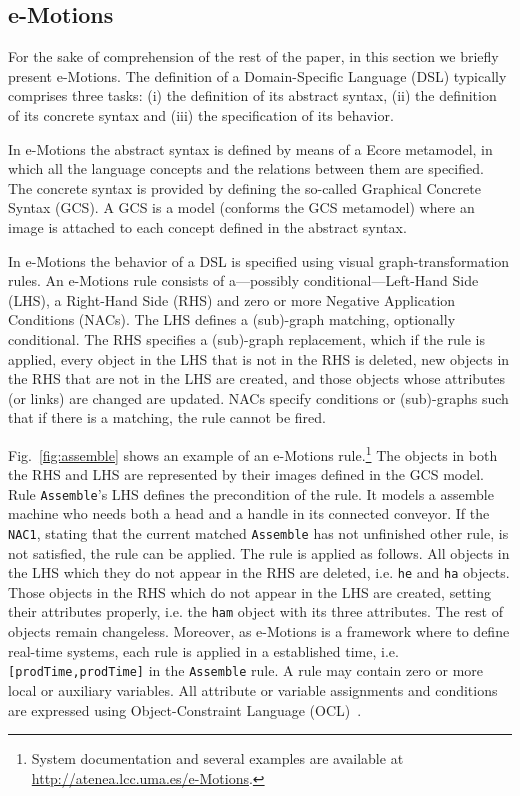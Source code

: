 \documentclass[draft]{llncs}
\newcommand{\code}[1]{{\texttt{#1}}}
\begin{document}
\subsection{e-Motions}\label{sub:emotions}
For the sake of comprehension of the rest of the paper, in this section we briefly present e-Motions. The definition of a Domain-Specific Language (DSL) typically comprises three tasks: (i) the definition of its abstract syntax, (ii) the definition of its concrete syntax and (iii) the specification of its behavior.

In e-Motions the abstract syntax is defined by means of a Ecore metamodel, in which all the language concepts and the relations between them are specified. The concrete syntax is provided by defining the so-called Graphical Concrete Syntax (GCS). A GCS is a model (conforms the GCS metamodel) where an image is attached to each concept defined in the abstract syntax.

In e-Motions the behavior of a DSL is specified using visual graph-transformation rules. An e-Motions rule consists of a---possibly conditional---Left-Hand Side (LHS), a Right-Hand Side (RHS) and zero or more Negative Application Conditions (NACs). The LHS defines a (sub)-graph matching, optionally conditional. The RHS specifies a (sub)-graph replacement, which if the rule is applied, every object in the LHS that is not in the RHS is deleted, new objects in the RHS that are not in the LHS are created, and those objects whose attributes (or links) are changed are updated. NACs specify conditions or (sub)-graphs such that if there is a matching, the rule cannot be fired.

Fig.~\ref{fig:assemble} shows an example of an e-Motions rule.\footnote{System documentation and several examples are available at \url{http://atenea.lcc.uma.es/e-Motions}.} The objects in both the RHS and LHS are represented by their images defined in the GCS model. Rule \code{Assemble}'s LHS defines the precondition of the rule. It models a assemble machine who needs both a head and a handle in its connected conveyor. If the \code{NAC1}, stating that the current matched \code{Assemble} has not unfinished other rule, is not satisfied, the rule can be applied. The rule is applied as follows. All objects in the LHS which they do not appear in the RHS are deleted, i.e. \code{he} and \code{ha} objects. Those objects in the RHS which do not appear in the LHS are created, setting their attributes properly, i.e. the \code{ham} object with its three attributes. The rest of objects remain changeless. Moreover, as e-Motions is a framework where to define real-time systems, each rule is applied in a established time, i.e. \code{[prodTime,prodTime]} in the \code{Assemble} rule. A rule may contain zero or more local or auxiliary variables. All attribute or variable assignments and conditions are expressed using Object-Constraint Language (OCL)~\cite{ocl}.
\end{document}
